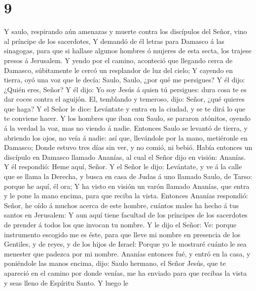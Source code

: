 \hypertarget{section-8}{%
\section{9}\label{section-8}}

 Y saulo, respirando aún amenazas y muerte contra los
discípulos del Señor, vino al príncipe de los sacerdotes,  Y
demandó de él letras para Damasco á las sinagogas, para que si hallase
algunos hombres ó mujeres de esta secta, los trajese presos á Jerusalem.
 Y yendo por el camino, aconteció que llegando cerca de
Damasco, súbitamente le cercó un resplandor de luz del cielo;
 Y cayendo en tierra, oyó una voz que le decía: Saulo,
Saulo, ¿por qué me persigues?  Y él dijo: ¿Quién eres,
Señor? Y él dijo: Yo soy Jesús á quien tú persigues: dura cosa te es dar
coces contra el aguijón.  El, temblando y temeroso, dijo:
Señor, ¿qué quieres que haga? Y el Señor le dice: Levántate y entra en
la ciudad, y se te dirá lo que te conviene hacer.  Y los
hombres que iban con Saulo, se pararon atónitos, oyendo á la verdad la
voz, mas no viendo á nadie.  Entonces Saulo se levantó de
tierra, y abriendo los ojos, no veía á nadie: así que, llevándole por la
mano, metiéronle en Damasco;  Donde estuvo tres días sin
ver, y no comió, ni bebió.  Había entonces un discípulo en
Damasco llamado Ananías, al cual el Señor dijo en visión: Ananías. Y él
respondió: Heme aquí, Señor.  Y el Señor le dijo:
Levántate, y ve á la calle que se llama la Derecha, y busca en casa de
Judas á uno llamado Saulo, de Tarso: porque he aquí, él ora;
 Y ha visto en visión un varón llamado Ananías, que entra y
le pone la mano encima, para que reciba la vista.  Entonces
Ananías respondió: Señor, he oído á muchos acerca de este hombre,
cuántos males ha hecho á tus santos en Jerusalem:  Y aun
aquí tiene facultad de los príncipes de los sacerdotes de prender á
todos los que invocan tu nombre.  Y le dijo el Señor: Ve:
porque instrumento escogido me es éste, para que lleve mi nombre en
presencia de los Gentiles, y de reyes, y de los hijos de Israel:
 Porque yo le mostraré cuánto le sea menester que padezca
por mi nombre.  Ananías entonces fué, y entró en la casa, y
poniéndole las manos encima, dijo: Saulo hermano, el Señor Jesús, que te
apareció en el camino por donde venías, me ha enviado para que recibas
la vista y seas lleno de Espíritu Santo.  Y luego le
